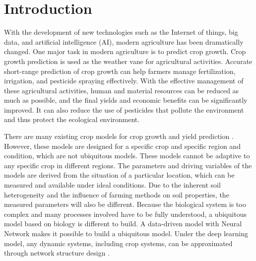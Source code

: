 \documentclass[acmsmall,manuscript, screen, review]{acmart}
\begin{document}
\section{Introduction}
With the development of new technologies such as the Internet of things, big data, and artificial intelligence (AI), modern agriculture has been dramatically changed. One major task in modern agriculture is to predict crop growth. Crop growth prediction is used as the weather vane for agricultural activities. Accurate short-range prediction of crop growth can help farmers manage fertilization, irrigation, and pesticide spraying effectively. With the effective management of these agricultural activities, human and material resources can be reduced as much as possible, and the final yields and economic benefits can be significantly improved. It can also reduce the use of pesticides that pollute the environment and thus protect the ecological environment.

There are many existing crop models for crop growth and yield prediction \cite{book,BRISSON2003309,boogaard1998wofost}. However, these models are designed for a specific crop and specific region and condition, which are not ubiquitous models. These models cannot be adaptive to any specific crop in different regions. The parameters and driving variables of the models are derived from the situation of a particular location, which can be measured and available under ideal conditions. Due to the inherent soil heterogeneity and the influence of farming methods on soil properties, the measured parameters will also be different. Because the biological system is too complex and many processes involved have to be fully understood, a ubiquitous model based on biology is different to build. A data-driven model with Neural Network makes it possible to build a ubiquitous model. Under the deep learning model, any dynamic systems, including crop systems, can be approximated through network structure design \cite{lecun_deep_2015,2020Deep}.
\end{document}
